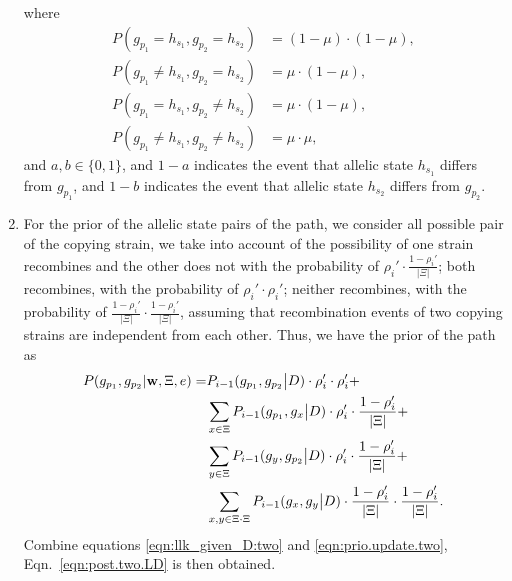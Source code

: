 \documentclass{bioinfo}
\begin{document}
\begin{enumerate}
\begin{equation}
\end{equation}
where
\begin{align*}
P(g_{p_1} = h_{s_1}, g_{p_2} = h_{s_2})       & = (1-\mu)\cdot(1-\mu) , \\
P(g_{p_1} \neq h_{s_1}, g_{p_2} = h_{s_2})    & = \mu\cdot(1-\mu),\\
P(g_{p_1} = h_{s_1}, g_{p_2} \neq h_{s_2})    & = \mu\cdot(1-\mu),\\
P(g_{p_1} \neq h_{s_1}, g_{p_2} \neq h_{s_2}) & = \mu \cdot \mu,
\end{align*}
and $a,b \in \{0, 1\}$, and $1-a$ indicates the event that allelic state $h_{s_1}$ differs from $g_{p_1}$, and $1-b$ indicates the event that allelic state $h_{s_2}$ differs from $g_{p_2}$.

\item
For the prior of the allelic state pairs of the path, we consider all possible pair of the copying strain, we take into account of the possibility of one strain recombines and the other does not with the probability of $\rho_i' \cdot \frac{1-\rho_i'}{|\Xi|}$; both recombines, with the probability of $\rho_i' \cdot \rho_i'$; neither recombines, with the probability of $\frac{1-\rho_i'}{|\Xi|} \cdot\frac{1-\rho_i'}{|\Xi|}$, assuming that recombination events of two copying strains are independent from each other. Thus, we have the prior of the path as
\begin{equation}
\begin{split}
P(g_{p_1}, g_{p_2}|\mathbf{w}, \Xi, e) = &  P_{i-1}(g_{p_1},g_{p_2}\big{|}D) \cdot \rho_i' \cdot \rho_i' + \\
                                         & \sum_{x\in \Xi} P_{i-1}(g_{p_1},g_{x}\big{|}D) \cdot \rho_i' \cdot \frac{1-\rho_i'}{|\Xi|} + \\
                                         & \sum_{y\in \Xi} P_{i-1}(g_{y},g_{p_2}\big{|}D) \cdot \rho_i' \cdot\frac{1-\rho_i'}{|\Xi|}+ \\
                                         & \sum_{x,y\in \Xi\cdot \Xi} P_{i-1}(g_{x},g_{y}\big{|}D)  \cdot\frac{1-\rho_i'}{|\Xi|} \cdot\frac{1-\rho_i'}{|\Xi|}. \label{eqn:prio.update.two}
\end{split}
\end{equation}
Combine equations \eqref{eqn:llk_given_D:two} and \eqref{eqn:prio.update.two}, Eqn.~\eqref{eqn:post.two.LD} is then obtained.


\end{enumerate}
\end{document}
